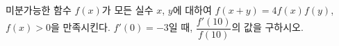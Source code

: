 미분가능한 함수 $f(x)$가 모든 실수 $x$, $y$에 대하여 $f(x+y)=4f(x)f(y)$, $f(x)>0$을 만족시킨다. $f'(0)=-3$일 때, $\dfrac{f'(10)}{f(10)}$의 값을 구하시오.
